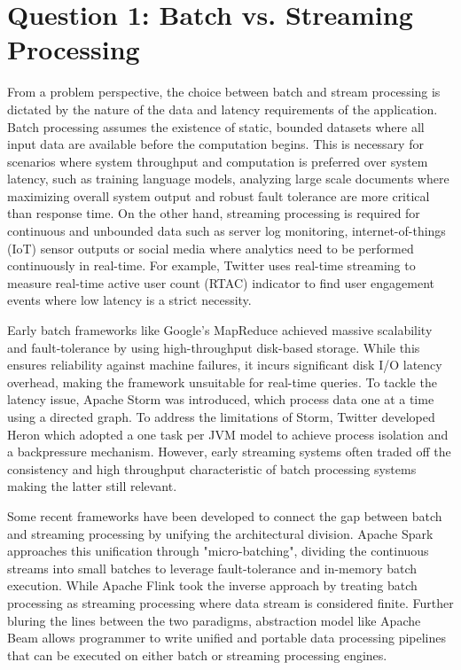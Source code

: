 \section{Question 1: Batch vs. Streaming Processing}

From a problem perspective, the choice between batch and stream processing is dictated by the nature of the data and latency requirements of the application. Batch processing assumes the existence of static, bounded datasets where all input data are available before the computation begins\cite{computers3040117}. This is necessary for scenarios where system throughput and computation is preferred over system latency, such as training language models, analyzing large scale documents where maximizing overall system output and robust fault tolerance are more critical than response time. On the other hand, streaming processing is required for continuous and unbounded data such as server log monitoring, internet-of-things (IoT) sensor outputs or social media where analytics need to be performed continuously in real-time. For example, Twitter uses real-time streaming to measure real-time active user count (RTAC) indicator to find user engagement events\cite{10.1145/2723372.2742788} where low latency is a strict necessity.


Early batch frameworks like Google's MapReduce \cite{dean2004mapreduce} achieved massive scalability and fault-tolerance by using high-throughput disk-based storage. While this ensures reliability against machine failures, it incurs significant disk I/O latency overhead, making the framework unsuitable for real-time queries. To tackle the latency issue, Apache Storm was introduced, which process data one at a time using a directed graph\cite{10.1145/2588555.2595641}. To address the limitations of Storm, Twitter developed Heron which adopted a one task per JVM model to achieve process isolation and a backpressure mechanism. However, early streaming systems often traded off the consistency and high throughput characteristic of batch processing systems making the latter still relevant.

Some recent frameworks have been developed to connect the gap between batch and streaming processing by unifying the architectural division. Apache Spark approaches this unification through "micro-batching", dividing the continuous streams into small batches to leverage fault-tolerance and in-memory batch execution\cite{computers3040117}. While Apache Flink took the inverse approach by treating batch processing as streaming processing where data stream is considered finite\cite{df177547a4364bb0a7e2470b83025bb0}. Further bluring the lines between the two paradigms, abstraction model like Apache Beam \cite{li2018challenges} allows programmer to write unified and portable data processing pipelines that can be executed on either batch or streaming processing engines.

